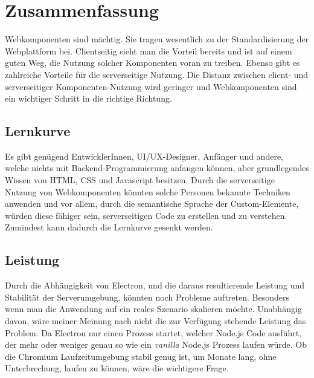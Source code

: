 \chapter{Zusammenfassung}
Webkomponenten sind mächtig. Sie tragen wesentlich zu der Standardisierung der Webplattform bei. Clientseitig sieht man die Vorteil bereits und ist auf einem guten Weg, die Nutzung solcher Komponenten voran zu treiben. Ebenso gibt es zahlreiche Vorteile für die serverseitige Nutzung. Die Distanz zwischen client- und serverseitiger Komponenten-Nutzung wird geringer und Webkomponenten sind ein wichtiger Schritt in die richtige Richtung.

\section{Lernkurve}
Es gibt genügend EntwicklerInnen, UI/UX-Designer, Anfänger und andere, welche nichts mit Backend-Programmierung anfangen können, aber grundlegendes Wissen von HTML, CSS und Javascript besitzen. Durch die serverseitige Nutzung von Webkomponenten könnten solche Personen bekannte Techniken anwenden und vor allem, durch die semantische Sprache der Custom-Elemente, würden diese fähiger sein, serverseitigen Code zu erstellen und zu verstehen. Zumindest kann dadurch die Lernkurve gesenkt werden.    

\section{Leistung}
Durch die Abhängigkeit von Electron, und die daraus resultierende Leistung und Stabilität der Serverumgebung, könnten noch Probleme auftreten. Besonders wenn man die Anwendung auf ein reales Szenario skalieren möchte. Unabhängig davon, wäre meiner Meinung nach nicht die zur Verfügung stehende Leistung das Problem. Da Electron nur einen Prozess startet, welcher Node.js Code ausführt, der mehr oder weniger genau so wie ein \textit{vanilla} Node.js Prozess laufen würde. Ob die Chromium Laufzeitumgebung stabil genug ist, um Monate lang, ohne Unterbrechung, laufen zu können, wäre die wichtigere Frage.

